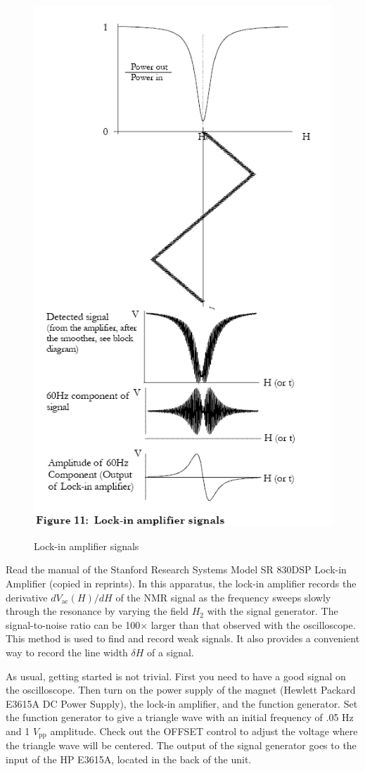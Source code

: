 \documentclass{../lab}
\begin{document}
\begin{figure}[h]
    \centering
    \href{http://experimentationlab.berkeley.edu/sites/default/files/images/NMR25.gif}{\includegraphics[width=0.5\linewidth]{images/NMR25.png}}
    \caption{Lock-in amplifier signals}
    \label{fig:LockInAmplifierSignals}
\end{figure}

Read the manual of the Stanford Research Systems Model SR 830DSP Lock-in Amplifier (copied in reprints). In this apparatus, the lock-in amplifier records the derivative $dV_\text{ac}(H)/dH$ of the NMR signal as the frequency sweeps slowly through the resonance by varying the field $H_2$ with the signal generator. The signal-to-noise ratio can be 100$\times$ larger than that observed with the oscilloscope. This method is used to find and record weak signals. It also provides a convenient way to record the line width $\delta H$ of a signal.

As usual, getting started is not trivial. First you need to have a good signal on the oscilloscope. Then turn on the power supply of the magnet (Hewlett Packard E3615A DC Power Supply), the lock-in amplifier, and the function generator. Set the function generator to give a triangle wave with an initial frequency of .05 Hz and 1 $V_\text{pp}$ amplitude. Check out the OFFSET control to adjust the voltage where the triangle wave will be centered. The output of the signal generator goes to the input of the HP E3615A, located in the back of the unit.
\end{document}
